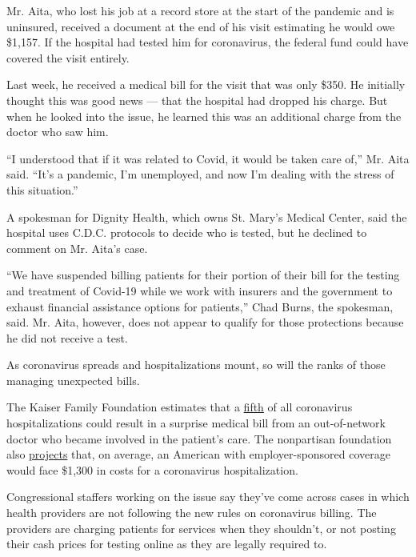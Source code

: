 Mr. Aita, who lost his job at a record store at the start of the
pandemic and is uninsured, received a document at the end of his visit
estimating he would owe \$1,157. If the hospital had tested him for
coronavirus, the federal fund could have covered the visit entirely.

Last week, he received a medical bill for the visit that was only \$350.
He initially thought this was good news --- that the hospital had
dropped his charge. But when he looked into the issue, he learned this
was an additional charge from the doctor who saw him.

``I understood that if it was related to Covid, it would be taken care
of,'' Mr. Aita said. ``It's a pandemic, I'm unemployed, and now I'm
dealing with the stress of this situation.''

A spokesman for Dignity Health, which owns St. Mary's Medical Center,
said the hospital uses C.D.C. protocols to decide who is tested, but he
declined to comment on Mr. Aita's case.

``We have suspended billing patients for their portion of their bill for
the testing and treatment of Covid-19 while we work with insurers and
the government to exhaust financial assistance options for patients,''
Chad Burns, the spokesman, said. Mr. Aita, however, does not appear to
qualify for those protections because he did not receive a test.

As coronavirus spreads and hospitalizations mount, so will the ranks of
those managing unexpected bills.

The Kaiser Family Foundation estimates that a
\href{https://www.kff.org/coronavirus-covid-19/issue-brief/potential-costs-of-coronavirus-treatment-for-people-with-employer-coverage/}{fifth}
of all coronavirus hospitalizations could result in a surprise medical
bill from an out-of-network doctor who became involved in the patient's
care. The nonpartisan foundation also
\href{https://www.kff.org/coronavirus-covid-19/issue-brief/five-things-to-know-about-the-cost-of-covid-19-testing-and-treatment/}{projects}
that, on average, an American with employer-sponsored coverage would
face \$1,300 in costs for a coronavirus hospitalization.

Congressional staffers working on the issue say they've come across
cases in which health providers are not following the new rules on
coronavirus billing. The providers are charging patients for services
when they shouldn't, or not posting their cash prices for testing online
as they are legally required to.

